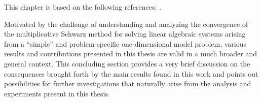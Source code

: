 \ifnum{}

This chapter is based on the following references: \cite{EchLieNab18, EchLieSzyTic18, EchLieTic19}.


\else
Motivated by the challenge of understanding and analyzing the convergence of
the multiplicative Schwarz method for solving linear algebraic systems arising
from a ``simple'' and problem-specific one-dimensional model problem, various
results and contributions presented in this thesis are valid in a much broader
and general context. This concluding section provides a very brief discussion
on the consequences brought forth by the main results found in this
work and points out possibilities for further investigations that naturally
arise from the analysis and experiments present in this thesis.


\medskip

